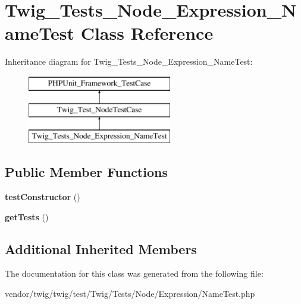 \hypertarget{classTwig__Tests__Node__Expression__NameTest}{}\section{Twig\+\_\+\+Tests\+\_\+\+Node\+\_\+\+Expression\+\_\+\+Name\+Test Class Reference}
\label{classTwig__Tests__Node__Expression__NameTest}
Inheritance diagram for Twig\+\_\+\+Tests\+\_\+\+Node\+\_\+\+Expression\+\_\+\+Name\+Test\+:\begin{figure}[H]
\begin{center}
\leavevmode
\includegraphics[height=3.000000cm]{classTwig__Tests__Node__Expression__NameTest}
\end{center}
\end{figure}
\subsection*{Public Member Functions}
\begin{DoxyCompactItemize}
\item 
{\bfseries test\+Constructor} ()\hypertarget{classTwig__Tests__Node__Expression__NameTest_afc3ac7bb7d2461fb0932f5aa5feb59a4}{}\label{classTwig__Tests__Node__Expression__NameTest_afc3ac7bb7d2461fb0932f5aa5feb59a4}

\item 
{\bfseries get\+Tests} ()\hypertarget{classTwig__Tests__Node__Expression__NameTest_a8066e19d2b5258d0ad7d42e44ab0b8f9}{}\label{classTwig__Tests__Node__Expression__NameTest_a8066e19d2b5258d0ad7d42e44ab0b8f9}

\end{DoxyCompactItemize}
\subsection*{Additional Inherited Members}


The documentation for this class was generated from the following file\+:\begin{DoxyCompactItemize}
\item 
vendor/twig/twig/test/\+Twig/\+Tests/\+Node/\+Expression/Name\+Test.\+php\end{DoxyCompactItemize}
